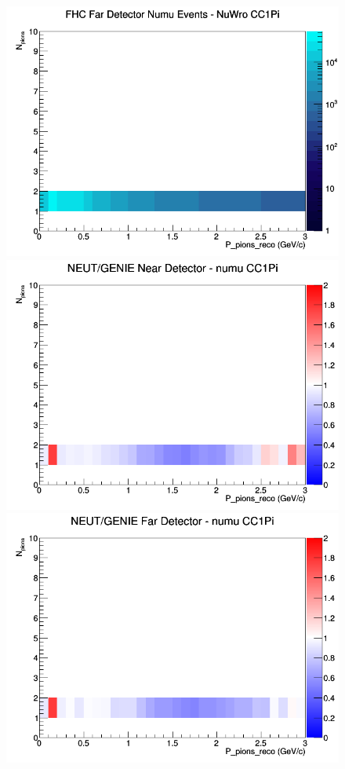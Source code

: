 \documentclass[12pt]{article}
\begin{document}
\begin{figure}[h]
\endminipage
{}
\includegraphics[width=\linewidth]{eff_N_P/GAr/pions/CC1Pi_FHC_FD_numu_N_P_NuWro.png}
\endminipage
\newline
{}
\includegraphics[width=\linewidth]{eff_N_P/GAr/pions/ratios/CC1Pi_NEUT_GENIE_numu_near_N_P.png}
\endminipage
{}
\includegraphics[width=\linewidth]{eff_N_P/GAr/pions/ratios/CC1Pi_NEUT_GENIE_numu_far_N_P.png}

\end{figure}
\end{document}
